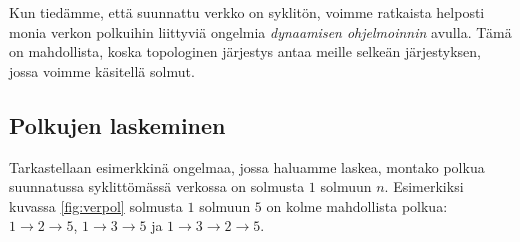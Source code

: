 
Kun tiedämme, että suunnattu verkko on syklitön,
voimme ratkaista helposti monia verkon polkuihin
liittyviä ongelmia \emph{dynaamisen ohjelmoinnin} avulla.
Tämä on mahdollista, koska topologinen järjestys antaa
meille selkeän järjestyksen, jossa voimme käsitellä solmut.

\subsection{Polkujen laskeminen}


Tarkastellaan esimerkkinä ongelmaa, jossa haluamme laskea,
montako polkua suunnatussa syklittömässä
verkossa on solmusta $1$ solmuun $n$.
Esimerkiksi kuvassa \ref{fig:verpol} solmusta $1$ solmuun $5$
on kolme mahdollista polkua:
$1 \rightarrow 2 \rightarrow 5$,
$1 \rightarrow 3 \rightarrow 5$ ja
$1 \rightarrow 3 \rightarrow 2 \rightarrow 5$.

